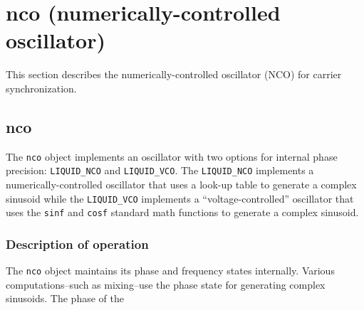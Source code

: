 % 
%

\section{nco (numerically-controlled oscillator)}
\label{module:nco}
This section describes the numerically-controlled oscillator (NCO) for carrier
synchronization.

\subsection{{nco}}
\label{module:nco:nco}
The {\tt nco} object implements an oscillator with two options for internal
phase precision: {\tt LIQUID\_NCO} and {\tt LIQUID\_VCO}.
The {\tt LIQUID\_NCO} implements a numerically-controlled oscillator that uses
a look-up table to generate a complex sinusoid while
the {\tt LIQUID\_VCO} implements a ``voltage-controlled'' oscillator that uses
the {\tt sinf} and {\tt cosf} standard math functions to generate a complex
sinusoid.

\subsubsection{Description of operation}
The {\tt nco} object maintains its phase and frequency states internally.
Various computations--such as mixing--use the phase state for generating
complex sinusoids.
The phase of the

